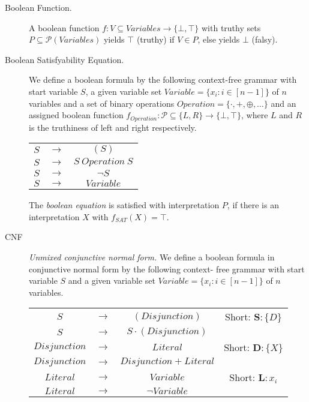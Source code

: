 \documentclass[12pt, letterpaper]{article}
\begin{document}
    \begin{description}
        \item[Boolean Function.] {
            A boolean function $f: V \subseteq Variables \rightarrow
            \{\bot, \top\}$ with truthy sets $P \subseteq \mathcal{P}
            (Variables)$ yields $\top$ (truthy) if $V \in P$, else
            yields $\bot$ (falsy).
        }
        \item[Boolean Satisfyability Equation.] {
            We define a boolean formula by the following context-free
            grammar with start variable $S$, a given variable set
            $Variable = \{x_i : i \in [n-1]\}$ of $n$ variables and a
            set of binary operations $Operation = \{\cdot, +, \oplus,
            \dots\}$ and an assigned boolean function $f_{Operation}
            : \mathcal{P} \subseteq \{L, R\} \rightarrow \{\bot, \top\}$,
            where $L$ and $R$ is the truthiness of left and right 
            respectively.

            \begin{center}
                \begin{tabular}{ccc}
                    $S$ & $\rightarrow$& $(S)$ \\ 
                    $S$ & $\rightarrow$& $S\ Operation\ S$ \\ 
                    $S$ & $\rightarrow$& $\lnot S$ \\ 
                    $S$ & $\rightarrow$& $Variable$ \\ 
                \end{tabular}
            \end{center}

            The \emph{boolean equation} is satisfied with interpretation
            $P$, if there is an interpretation $X$ with $f_{SAT}(X) = \top$.
        }
        \item[CNF] {
            \emph{Unmixed conjunctive normal form.} We define a boolean
            formula in conjunctive normal form by the following context-
            free grammar with start variable $S$ and a given variable
            set $Variable = \{x_i : i \in [n-1]\}$ of $n$ variables.

            \begin{center}
                \begin{tabular}{cccc}
                    $S$ & $\rightarrow$& $(Disjunction)$ & \small{Short:} $\mathbf{S}: \{D\}$  \\ 
                    $S$ & $\rightarrow$& $S \cdot (Disjunction)$ \\ 
                    $Disjunction$ & $\rightarrow$& $Literal$ & \small{Short:} $\mathbf{D}: \{X\}$ \\ 
                    $Disjunction$ & $\rightarrow$& $Disjunction + Literal$ \\ 
                    $Literal$ & $\rightarrow$& $Variable$ & \small{Short:} $\mathbf{L}: x_i$ \\ 
                    $Literal$ & $\rightarrow$& $\lnot Variable$ \\ 
                \end{tabular}
            \end{center}

}
\end{description}
\end{document}
